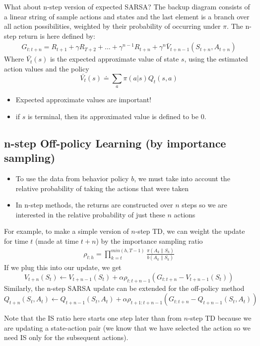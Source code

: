 \documentclass[sutton_barto_notes.tex]{subfiles}
\begin{document}
What about n-step version of expected SARSA? The backup diagram consists of a linear string of sample actions and states and the last element is a branch over all action possibilities, weighted by their probability of occurring under $\pi$. The n-step return is here defined by:
\begin{align}
G_{t:t+n} = R_{t+1} + \gamma R_{T+2} + ... + \gamma^{n-1} R_{t+n} + \gamma^n \bar{V}_{t+n-1}(S_{t+n}, A_{t+n}) \label{eq:7.8}\tag{7.8}
\end{align}
Where $\bar{V_t}(s)$ is the expected approximate value of state $s$, using the estimated action values and the policy
$$ \bar{V_t}(s) \doteq \sum_a \pi(a|s)Q_t(s,a) $$
\begin{itemize}
\item Expected approximate values are important!
\item if $s$ is terminal, then its approximated value is defined to be 0.
\end{itemize}

\subsection{n-step Off-policy Learning (by importance sampling)}

\begin{itemize}
\item To use the data from behavior policy $b$, we must take into account the relative probability of taking the actions that were taken
\item In n-step methods, the returns are constructed over $n$ steps so we are interested in the relative probability of just these $n$ actions
\end{itemize}

For example, to make a simple version of $n$-step TD, we can weight the update for time $t$ (made at time $t+n$) by the importance sampling ratio
\begin{align}
\rho_{t:h} = \prod_{k=t}^{min(h, T-1)} \frac{\pi(A_k\|S_k)}{b(A_k\|S_k)} \label{eq:7.10}\tag{7.10}
\end{align}
If we plug this into our update, we get
$$ V_{t+n}(S_t) \gets V_{t+n-1}(S_t)  + \alpha \rho_{t:t+n-1} (G_{t:t+n} - V_{t+n-1} (S_t)) $$
Similarly, the n-step SARSA update can be extended for the off-policy method
$$Q_{t+n}(S_t, A_t) \gets Q_{t+n-1}(S_t, A_t)  + \alpha \rho_{t+1:t+n-1} (G_{t:t+n} - Q_{t+n-1}(S_t, A_t)) $$

Note that the IS ratio here starts one step later than from $n$-step TD because we are updating a state-action pair (we know that we have selected the action so we need IS only for the subsequent actions).
\end{document}
